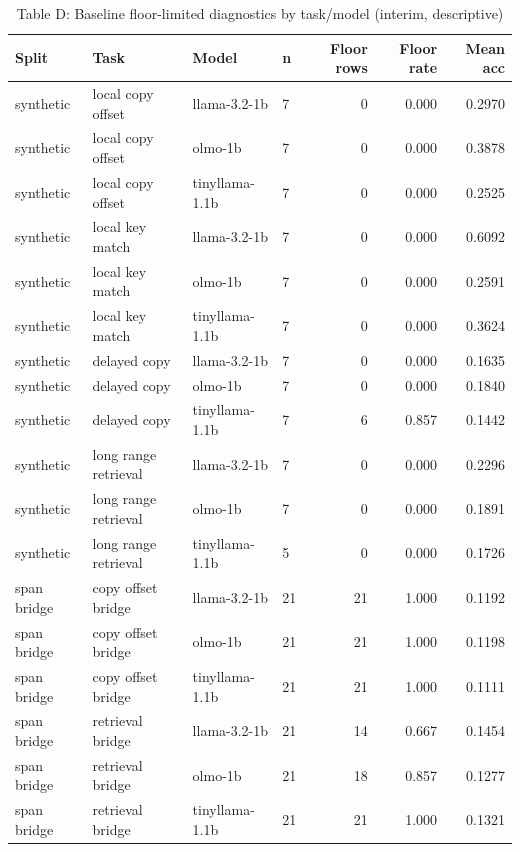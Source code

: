 \documentclass[11pt]{article}
\theoremstyle{definition}
\begin{document}
\begin{table}[ht]
\centering
\caption{Table D: Baseline floor-limited diagnostics by task/model (interim, descriptive)}
\footnotesize
\begin{tabular}{llllrrr}
\toprule
\textbf{Split} & \textbf{Task} & \textbf{Model} & \textbf{n} & \textbf{Floor rows} & \textbf{Floor rate} & \textbf{Mean acc} \\
\midrule
synthetic & local copy offset & llama-3.2-1b & 7 & 0 & 0.000 & 0.2970 \\
synthetic & local copy offset & olmo-1b & 7 & 0 & 0.000 & 0.3878 \\
synthetic & local copy offset & tinyllama-1.1b & 7 & 0 & 0.000 & 0.2525 \\
synthetic & local key match & llama-3.2-1b & 7 & 0 & 0.000 & 0.6092 \\
synthetic & local key match & olmo-1b & 7 & 0 & 0.000 & 0.2591 \\
synthetic & local key match & tinyllama-1.1b & 7 & 0 & 0.000 & 0.3624 \\
synthetic & delayed copy & llama-3.2-1b & 7 & 0 & 0.000 & 0.1635 \\
synthetic & delayed copy & olmo-1b & 7 & 0 & 0.000 & 0.1840 \\
synthetic & delayed copy & tinyllama-1.1b & 7 & 6 & 0.857 & 0.1442 \\
synthetic & long range retrieval & llama-3.2-1b & 7 & 0 & 0.000 & 0.2296 \\
synthetic & long range retrieval & olmo-1b & 7 & 0 & 0.000 & 0.1891 \\
synthetic & long range retrieval & tinyllama-1.1b & 5 & 0 & 0.000 & 0.1726 \\
span bridge & copy offset bridge & llama-3.2-1b & 21 & 21 & 1.000 & 0.1192 \\
span bridge & copy offset bridge & olmo-1b & 21 & 21 & 1.000 & 0.1198 \\
span bridge & copy offset bridge & tinyllama-1.1b & 21 & 21 & 1.000 & 0.1111 \\
span bridge & retrieval bridge & llama-3.2-1b & 21 & 14 & 0.667 & 0.1454 \\
span bridge & retrieval bridge & olmo-1b & 21 & 18 & 0.857 & 0.1277 \\
span bridge & retrieval bridge & tinyllama-1.1b & 21 & 21 & 1.000 & 0.1321 \\
\bottomrule
\end{tabular}
\end{table}
\end{document}

